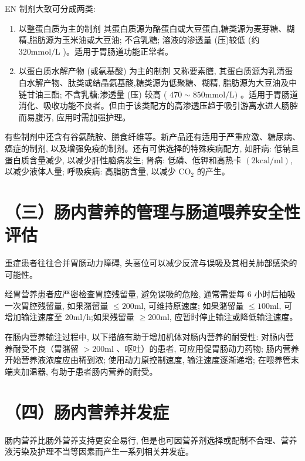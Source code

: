 \documentclass[10pt]{article}
\begin{document}
EN 制剂大致可分成两类:

\begin{enumerate}
  \item 以整蛋白质为主的制剂 其蛋白质源为酪蛋白或大豆蛋白,糖类源为麦芽糖、糊精,脂肪源为玉米油或大豆油; 不含乳糖; 溶液的渗透量 (压)较低 (约 $320 \mathrm{mmol} / \mathrm{L}$ )。适用于胃肠道功能正常者。

  \item 以蛋白质水解产物 (或氨基酸) 为主的制剂 又称要素膳, 其蛋白质源为乳清蛋白水解产物、肽类或结晶氨基酸,糖类源为低聚糖、糊精, 脂肪源为大豆油及中链甘油三酯; 不含乳糖;渗透量 (压) 较高 ( $470 \sim 850 \mathrm{mmol} / \mathrm{L})$ 。适用于胃肠道消化、吸收功能不良者。但由于该类配方的高渗透压趋于吸引游离水进人肠腔而易腹泻, 应用时需加强护理。

\end{enumerate}

有些制剂中还含有谷氨酰胺、膳食纤维等。新产品还有适用于严重应激、糖尿病、癌症的制剂, 以及增强免疫的制剂。还有可供选择的特殊疾病配方, 如肝病: 低钠且蛋白质含量减少, 以减少肝性脑病发生; 肾病: 低磷、低钾和高热卡 $(2 \mathrm{kcal} / \mathrm{ml})$, 以减少液体人量; 呼吸疾病: 高脂肪含量, 以减少 $\mathrm{CO}_{2}$ 的产生。

\section*{（三）肠内营养的管理与肠道喂养安全性评估}
重症患者往往合并胃肠动力障碍, 头高位可以减少反流与误吸及其相关肺部感染的可能性。

经胃营养患者应严密检查胃腔残留量, 避免误吸的危险, 通常需要每 6 小时后抽吸一次胃腔残留量, 如果潴留量 $\leqslant 200 \mathrm{ml}$, 可维持原速度; 如果潴留量 $\leqslant 100 \mathrm{ml}$, 可增加输注速度至 $20 \mathrm{ml} / \mathrm{h}$;如果残留量 $\geqslant 200 \mathrm{ml}$, 应暂时停止输注或降低输注速度。

在肠内营养输注过程中, 以下措施有助于增加机体对肠内营养的耐受性: 对肠内营养耐受不良（胃潴留 $>200 \mathrm{ml}$ 、呕吐）的患者, 可应用促胃肠动力药物; 肠内营养开始营养液浓度应由稀到浓; 使用动力厡控制速度, 输注速度逐渐递增; 在喂养管末端夹加温器, 有助于患者肠内营养的耐受。

\section*{（四）肠内营养并发症}
肠内营养比肠外营养支持更安全易行, 但是也可因营养剂选择或配制不合理、营养液污染及护理不当等因素而产生一系列相关并发症。
\end{document}
